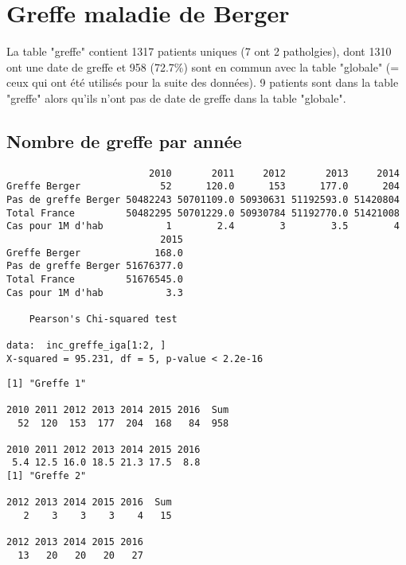 \documentclass[11pt,a4paper]{article}\usepackage[]{graphicx}\usepackage[]{color}
\makeatletter
\newenvironment{kframe}{%
 \def\at@end@of@kframe{}%
 \ifinner\ifhmode%
  \def\at@end@of@kframe{\end{minipage}}%
  \begin{minipage}{\columnwidth}%
 \fi\fi%
 \def\FrameCommand##1{\hskip\@totalleftmargin \hskip-\fboxsep
 \colorbox{shadecolor}{##1}\hskip-\fboxsep
     \hskip-\linewidth \hskip-\@totalleftmargin \hskip\columnwidth}%
 \MakeFramed {\advance\hsize-\width
   \@totalleftmargin\z@ \linewidth\hsize
   \@setminipage}}%
 {\par\unskip\endMakeFramed%
 \at@end@of@kframe}
\newenvironment{knitrout}{}{} %
\makeatother
\begin{document}
  
\section{Greffe maladie de Berger}

La table "greffe" contient 1317 patients uniques (7 ont 2 patholgies), dont 1310 ont une date de greffe et 958 (72.7\%) sont en commun avec la table "globale" (= ceux qui ont été utilisés pour la suite des données). 9 patients sont dans la table "greffe" alors qu'ils n'ont pas de date de greffe dans la table "globale".

  \subsection{Nombre de greffe par année}

\begin{knitrout}
\color{fgcolor}\begin{kframe}
\begin{verbatim}
                         2010       2011     2012       2013     2014
Greffe Berger              52      120.0      153      177.0      204
Pas de greffe Berger 50482243 50701109.0 50930631 51192593.0 51420804
Total France         50482295 50701229.0 50930784 51192770.0 51421008
Cas pour 1M d'hab           1        2.4        3        3.5        4
                           2015
Greffe Berger             168.0
Pas de greffe Berger 51676377.0
Total France         51676545.0
Cas pour 1M d'hab           3.3

	Pearson's Chi-squared test

data:  inc_greffe_iga[1:2, ]
X-squared = 95.231, df = 5, p-value < 2.2e-16
\end{verbatim}
\end{kframe}
\end{knitrout}

\begin{knitrout}
\color{fgcolor}\begin{kframe}
\begin{verbatim}
[1] "Greffe 1"

2010 2011 2012 2013 2014 2015 2016  Sum 
  52  120  153  177  204  168   84  958 

2010 2011 2012 2013 2014 2015 2016 
 5.4 12.5 16.0 18.5 21.3 17.5  8.8 
[1] "Greffe 2"

2012 2013 2014 2015 2016  Sum 
   2    3    3    3    4   15 

2012 2013 2014 2015 2016 
  13   20   20   20   27 
\end{verbatim}
\end{kframe}
\end{knitrout}
\end{document}
